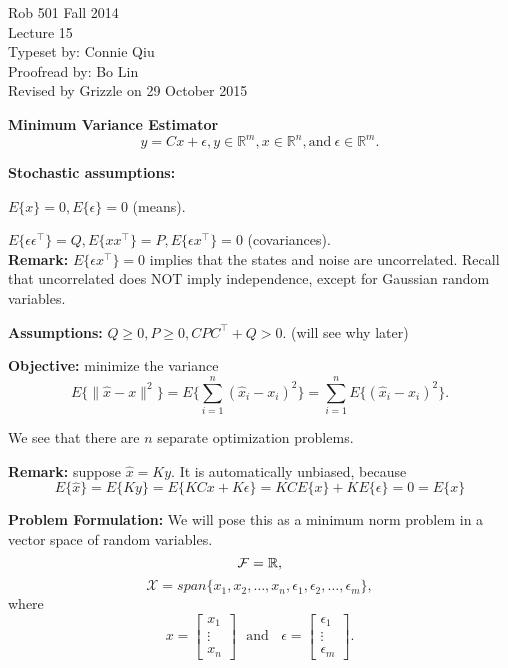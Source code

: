 \documentclass[letterpaper]{article}
\begin{document}
\baselineskip=48pt  %


\setlength{\parskip}{.3in}
\setlength{\itemsep}{.3in}

\pagestyle{plain}

{\Large \bf
\begin{center}
Rob 501 Fall 2014\\
Lecture 15\\
Typeset by:  Connie Qiu\\
Proofread by: Bo Lin\\
Revised by Grizzle on 29 October 2015
\end{center}
}

\Large




\textbf{Minimum Variance Estimator}
$$y=Cx+\epsilon, y\in \mathbb{R}^m, x \in \mathbb{R}^n, \text{and}~ \epsilon\in \mathbb{R}^m.$$

\textbf{Stochastic assumptions:}

$E\{x\}=0, E\{\epsilon\}= 0$ (means).

$E\{\epsilon \epsilon^\top \}=Q, E\{xx^\top \}= P, E\{\epsilon x^\top \}=0$ (covariances).\\

\textbf{Remark:} $E\{\epsilon x^\top \}=0$ implies that the states and noise are uncorrelated. Recall that uncorrelated does NOT imply independence, except for Gaussian random variables.

\textbf{Assumptions:}  $Q\ge 0 , P \ge 0, CPC^\top +Q >0$.  (will see why later)

\textbf{Objective:} minimize the variance
$$E\{\|\hat x -x\| ^2\} = E\{ \sum\limits_{i=1}^n (\hat x_i-x_i)^2\} = \sum\limits_{i=1}^n E\{ (\hat x_i-x_i)^2 \}.$$


We see that there are $n$ separate optimization problems.

\textbf{Remark:} suppose $\hat x = Ky$. It is automatically unbiased, because
$$ E\{\hat x\}=E\{ Ky\} = E\{ KCx+K\epsilon\} = KCE\{x\}+KE\{\epsilon\}  = 0 =E\{x\}$$

\newpage

\textbf{Problem Formulation:} We will pose this as a minimum norm problem in a vector space of random variables.
$${\cal F} = \mathbb{R},$$
$$ \mathcal{X} = span\{x_1, x_2, \dots , x_n, \epsilon_1, \epsilon_2, \dots, \epsilon_m\},$$
where
$$x=   \begin{bmatrix}
    x_1\\
    \vdots\\
    x_n
  \end{bmatrix}~~~\text{and} ~~~~\epsilon =   \begin{bmatrix}
    \epsilon_1\\
    \vdots\\
    \epsilon_m
  \end{bmatrix}.$$
\end{document}

